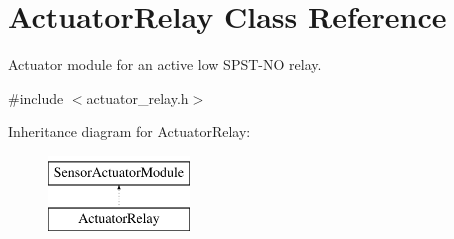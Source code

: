 \hypertarget{class_actuator_relay}{}\section{Actuator\+Relay Class Reference}
\label{class_actuator_relay}


Actuator module for an active low S\+P\+S\+T-\/\+N\+O relay.  




{\ttfamily \#include $<$actuator\+\_\+relay.\+h$>$}

Inheritance diagram for Actuator\+Relay\+:\begin{figure}[H]
\begin{center}
\leavevmode
\includegraphics[height=2.000000cm]{class_actuator_relay}
\end{center}
\end{figure}

